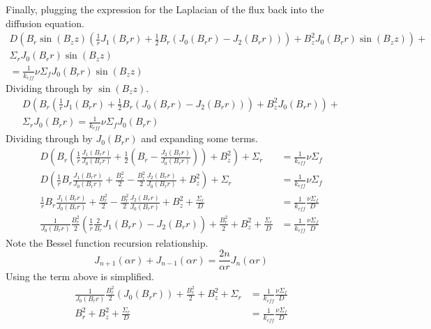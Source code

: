   Finally, plugging the expression for the Laplacian of the flux back into the
  diffusion equation.
  \begin{multline}
    D \left( B_r \sin(B_z z) \left( \frac{1}{r} J_1(B_r r) + \frac{1}{2} B_r
    \left( J_0(B_r r) - J_2(B_r r) \right) \right) + B_z^2 J_0(B_r r) \sin(B_z
    z) \right) + \\
    \Sigma_r J_0(B_r r) \sin(B_z z) \\
    = \frac{1}{k_{eff}} \nu
    \Sigma_f J_0(B_r r) \sin(B_z z)
  \end{multline}
  Dividing through by $\sin(B_z z)$.
  \begin{multline}
    D \left( B_r \left( \frac{1}{r} J_1(B_r r) + \frac{1}{2} B_r
    \left( J_0(B_r r) - J_2(B_r r) \right) \right) + B_z^2 J_0(B_r r) \right)+\\
    \Sigma_r J_0(B_r r) = \frac{1}{k_{eff}} \nu \Sigma_f J_0(B_r r) 
  \end{multline}
  Dividing through by $J_0(B_r r)$ and expanding some terms.
  \begin{align}
    D \left( B_r \left( \frac{1}{r} \frac{J_1(B_r r)}{J_0(B_r r)} + 
      \frac{1}{2} \left(B_r - \frac{J_2(B_r r)}{J_0(B_r r)} \right) \right) 
      + B_z^2 \right)+ \Sigma_r &= \frac{1}{k_{eff}} \nu \Sigma_f \\
    D \left( \frac{1}{r} B_r \frac{J_1(B_r r)}{J_0(B_r r)} + \frac{B_r^2}{2} -
      \frac{B_r^2}{2} \frac{J_2(B_r r)}{J_0(B_r r)} + B_z^2 \right) + \Sigma_r&=
      \frac{1}{k_{eff}} \nu \Sigma_f  \\
    \frac{1}{r} B_r \frac{J_1(B_r r)}{J_0(B_r r)} + \frac{B_r^2}{2} -
      \frac{B_r^2}{2} \frac{J_2(B_r r)}{J_0(B_r r)} + B_z^2 + 
      \frac{\Sigma_r}{D} &= \frac{1}{k_{eff}} \frac{\nu \Sigma_f}{D}\\
    \frac{1}{J_0(B_r r)} \frac{B_r^2}{2} \left(\frac{1}{r} \frac{2}{B_r} 
      J_1(B_r r) - J_2(B_r r) \right) + \frac{B_r^2}{2} + B_z^2 + 
      \frac{\Sigma_r}{D} &= \frac{1}{k_{eff}} \frac{\nu \Sigma_f}{D}
  \end{align}
  Note the Bessel function recursion relationship.
  \begin{equation} \label{eq:bessel_recursion}
    J_{n+1}(\alpha r) + J_{n-1}(\alpha r) = \frac{2n}{\alpha r} J_n(\alpha r)
  \end{equation}
  Using  the term above is simplified.
  \begin{align}
    \frac{1}{J_0(B_r r)} \frac{B_r^2}{2} \left( J_0(B_r r) \right) + 
      \frac{B_r^2}{2} + B_z^2 + \Sigma_r &= \frac{1}{k_{eff}} 
      \frac{\nu \Sigma_f}{D} \\
    B_r^2 + B_z^2 + \frac{\Sigma_r}{D} &= \frac{1}{k_{eff}} \frac{\nu \Sigma_f}
      {D}
  \end{align}
